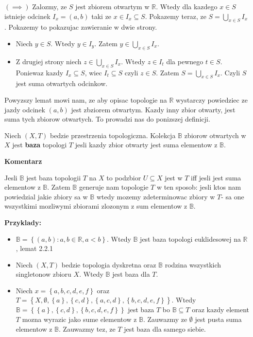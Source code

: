 \documentclass{article}
\begin{document}
$(\implies)$ Zalozmy, ze $S$ jest zbiorem otwartym w $\mathbb{R}$. Wtedy dla kazdego $x \in S$ istnieje odcinek $I_{x} = (a,b)$ taki ze $x \in I_{x} \subseteq S$. Pokazemy teraz, ze $S = \bigcup\limits_{x \in S}I_{x}$.
Pokazemy to pokazujac zawieranie w dwie strony.

\begin{itemize}
    \item Niech $y \in S$. Wtedy $y \in I_{y}$. Zatem $y \in \bigcup\limits_{x \in S}I_{x}$.
    \item Z drugiej strony niech $z \in \bigcup\limits_{x \in S}I_{x}$. Wtedy $z \in I_{t}$ dla pewnego $t \in S$. Poniewaz kazdy $I_{x} \subseteq S$, wiec $I_{t} \subseteq S$ czyli $z\in S$. Zatem $S = \bigcup\limits_{x \in S}I_{x}$. Czyli $S$ jest suma otwartych odcinkow. 

\end{itemize}
\vspace{5mm}
Powyzszy lemat mowi nam, ze aby opisac topologie na $\mathbb{R}$ wystarczy powiedziec ze jazdy odcinek $(a,b)$ jest zbziorem otwartym. Kazdy inny zbior otwarty, jest suma tych zbiorow otwartych. To prowadzi nas do ponizszej definicji.

\begin{tcolorbox}[colback=white!90!red,colframe=black!35!red,title=2.2.2 Definicja: Baza topologii]

    Niech $(X,T)$ bedzie przestrzenia topologiczna. Kolekcja $\mathbb{B}$ zbiorow otwartych w $X$ jest \textbf{baza} topologi $T$ jesli kazdy zbior otwarty jest suma elementow z $\mathbb{B}$.

\end{tcolorbox}


\textbf{Komentarz}

Jesli $\mathbb{B}$ jest baza topologii $T$ na $X$ to podzbior $U \subseteq X$ jest w $T$ iff jesli jest suma elementow z $\mathbb{B}$. Zatem $\mathbb{B}$ generuje nam topologie $T$ w ten sposob: jesli ktos nam powiedzial jakie zbiory sa w $\mathbb{B}$ wtedy mozemy zdeterminowac zbiory w $T$- sa one wszystkimi mozliwymi zbiorami zlozonym z sum elementow z $\mathbb{B}$.

\textbf{Przyklady:}
\begin{itemize}
    \item $\mathbb{B} = \left\{ (a,b): a,b \in \mathbb{R}, a<b \right\}$. Wtedy $\mathbb{B}$ jest baza topologi euklidesowej na $\mathbb{R}$, lemat 2.2.1
    \item Niech $(X,T)$ bedzie topologia dyskretna oraz $\mathbb{B}$ rodzina wszystkich singletonow zbioru $X$. Wtedy $\mathbb{B}$ jest baza dla $T$.
    \item Niech $x = \left\{ a,b,c,d,e,f \right\}$ oraz $T = \left\{ X, \emptyset, \left\{ a \right\}, \left\{ c,d \right\}, \left\{ a,c,d \right\}, \left\{ b,c,d,e,f \right\}   \right\}$. Wtedy $\mathbb{B} = \left\{ \left\{ a \right\}, \left\{ c,d \right\}, \left\{ b,c,d,e,f \right\}  \right\}$ jest baza $T$ bo $\mathbb{B} \subseteq T$ oraz kazdy element $T$ mozna wyrazic jako sume elementow z $\mathbb{B}$. Zauwazmy ze $\emptyset$ jest pusta suma elementow z $\mathbb{B}$. Zauwazmy tez, ze $T$ jest baza dla samego siebie.
\end{itemize}
\end{document}
